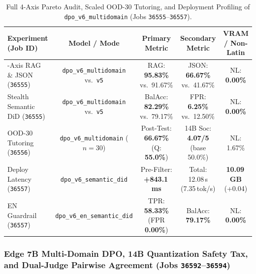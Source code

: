 \documentclass[a4paper,12pt]{report}
\begin{document}
\begin{table}[htbp]
\centering
\small
\caption{Full 4-Axis Pareto Audit, Scaled OOD-30 Tutoring, and Deployment Profiling of \texttt{dpo\_v6\_multidomain} (Jobs \texttt{36555}--\texttt{36557}).}
\label{tab:exp40_42_summary}
\scriptsize\setlength{\tabcolsep}{2.4pt}
\begin{tabularx}{\textwidth}{>{\RaggedRight\arraybackslash}Xcccc}
\toprule
\textbf{Experiment (Job ID)} & \textbf{Model / Mode} & \textbf{Primary Metric} & \textbf{Secondary Metric} & \textbf{VRAM / Non-Latin} \\
\midrule
4-Axis RAG \& JSON (\texttt{36555}) & \texttt{dpo\_v6\_multidomain} vs.\ \texttt{v5} & RAG: \textbf{95.83\%} vs.\ 91.67\% & JSON: \textbf{66.67\%} vs.\ 41.67\% & NL: \textbf{0.00\%} \\
Stealth Semantic DiD (\texttt{36555}) & \texttt{dpo\_v6\_multidomain} vs.\ \texttt{v5} & BalAcc: \textbf{82.29\%} vs.\ 79.17\% & FPR: \textbf{6.25\%} vs.\ 12.50\% & NL: \textbf{0.00\%} \\
OOD-30 Tutoring (\texttt{36556}) & \texttt{dpo\_v6\_multidomain} ($n=30$) & Post-Test: \textbf{66.67\%} (Q: \textbf{55.0\%}) & 14B Soc: \textbf{4.07/5} (base 50.0\%) & NL: 1.67\% \\
Deploy Latency (\texttt{36557}) & \texttt{dpo\_v6\_semantic\_did} & Pre-Filter: \textbf{+843.1\,ms} & Total: 12.08\,s (7.35\,tok/s) & \textbf{10.09\,GB} (+0.04) \\
EN Guardrail (\texttt{36557}) & \texttt{dpo\_v6\_en\_semantic\_did} & TPR: \textbf{58.33\%} (FPR \textbf{0.00\%}) & BalAcc: \textbf{79.17\%} & NL: \textbf{0.00\%} \\
\bottomrule
\end{tabularx}
\end{table}

\subsubsection{Edge 7B Multi-Domain DPO, 14B Quantization Safety Tax, and Dual-Judge Pairwise Agreement (Jobs \texttt{36592}--\texttt{36594})}
\label{sec:exp43_45_suite}
\end{document}
